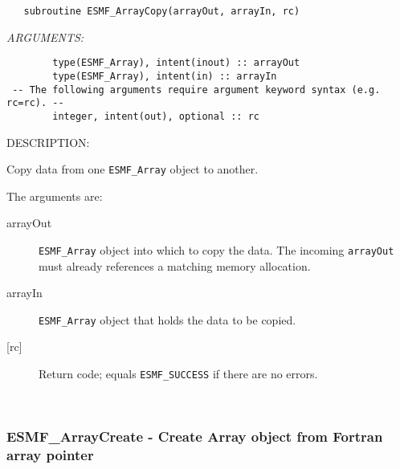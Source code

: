 \begin{verbatim}   subroutine ESMF_ArrayCopy(arrayOut, arrayIn, rc)\end{verbatim}{\em ARGUMENTS:}
\begin{verbatim}        type(ESMF_Array), intent(inout) :: arrayOut
        type(ESMF_Array), intent(in) :: arrayIn
 -- The following arguments require argument keyword syntax (e.g. rc=rc). --
        integer, intent(out), optional :: rc\end{verbatim}
{\sf DESCRIPTION:\\ }


   Copy data from one {\tt ESMF\_Array} object to another.
  
   The arguments are:
   \begin{description}
   \item[arrayOut]
   {\tt ESMF\_Array} object into which to copy the data. The incoming
   {\tt arrayOut} must already references a matching memory allocation.
   \item[arrayIn]
   {\tt ESMF\_Array} object that holds the data to be copied.
   \item[{[rc]}]
   Return code; equals {\tt ESMF\_SUCCESS} if there are no errors.
   \end{description}
   
 
\mbox{}\hrulefill\ 
 
\subsubsection [ESMF\_ArrayCreate] {ESMF\_ArrayCreate - Create Array object from Fortran array pointer }


